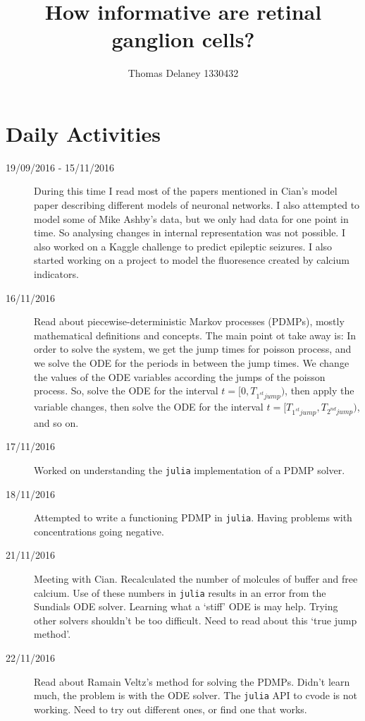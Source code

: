 \documentclass[a4paper,12pt]{article}
\title{How informative are retinal ganglion cells?}
\author{Thomas Delaney 1330432}
\theoremstyle{definition}
\begin{document}
\section*{Daily Activities}

\begin{description}
	\item[19/09/2016 - 15/11/2016] During this time I read most of the papers mentioned in Cian's model paper describing different models of neuronal networks. I also attempted to model some of Mike Ashby's data, but we only had data for one point in time. So analysing changes in internal representation was not possible. I also worked on a Kaggle challenge to predict epileptic seizures. I also started working on a project to model the fluoresence created by calcium indicators.

	\item[16/11/2016] Read about piecewise-deterministic Markov processes (PDMPs), mostly \\ mathematical definitions and concepts. The main point ot take away is: In order to solve the system, we get the jump times for poisson process, and we solve the ODE for the periods in between the jump times. We change the values of the ODE variables according the jumps of the poisson process. So, solve the ODE for the interval $t = [0, T_{1^{st} jump})$, then apply the variable changes, then solve the ODE for the interval $t = [T_{1^{st} jump}, T_{2^{nd} jump})$, and so on.

	\item[17/11/2016] Worked on understanding the \texttt{julia} implementation of a PDMP solver.

	\item[18/11/2016] Attempted to write a functioning PDMP in \texttt{julia}. Having problems with concentrations going negative.

	\item[21/11/2016] Meeting with Cian. Recalculated the number of molcules of buffer and free calcium. Use of these numbers in \texttt{julia} results in an error from the Sundials ODE solver. Learning what a `stiff' ODE is may help. Trying other solvers shouldn't be too difficult. Need to read about this `true jump method'.

	\item[22/11/2016] Read about Ramain Veltz's method for solving the PDMPs. Didn't learn much, the problem is with the ODE solver. The \texttt{julia} API to cvode is not working. Need to try out different ones, or find one that works.


\end{description}
\end{document}
